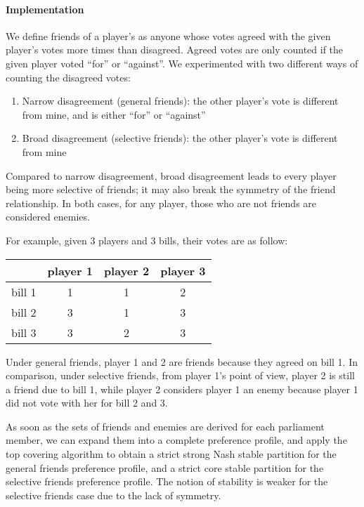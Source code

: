\paragraph{Implementation}

We define friends of a player's as anyone whose votes agreed with the given
player's votes more times than disagreed.
Agreed votes are only counted if the given player voted ``for'' or ``against''.
We experimented with two different ways of counting the disagreed votes:

\begin{enumerate}
  \item Narrow disagreement (general friends): the other player's vote is different from mine, and is either ``for'' or ``against''
  \item Broad disagreement (selective friends): the other player's vote is different from mine
\end{enumerate}

Compared to narrow disagreement, broad disagreement leads to every player being
more selective of friends; it may also break the symmetry of the friend relationship.
In both cases, for any player, those who are not friends are considered enemies.

For example, given 3 players and 3 bills, their votes are as follow:

\begin{table}[h!]
\centering
\begin{tabular}{|c|c|c|c|}
\hline
       & player 1 & player 2 & player 3 \\ \hline
bill 1 & 1 & 1 & 2 \\
bill 2 & 3 & 1 & 3 \\
bill 3 & 3 & 2 & 3 \\
\hline
\end{tabular}
\end{table}

Under general friends, player 1 and 2 are friends because they agreed on bill 1.
In comparison, under selective friends, from player 1's point of view, player 2
is still a friend due to bill 1, while player 2 considers player 1 an enemy
because player 1 did not vote with her for bill 2 and 3.

As soon as the sets of friends and enemies are derived for each parliament member,
we can expand them into a complete preference profile, and apply the top covering
algorithm to obtain a strict strong Nash stable partition for the general friends
preference profile, and a strict core stable partition for the selective friends
preference profile. The notion of stability is weaker for the selective friends case
due to the lack of symmetry.


